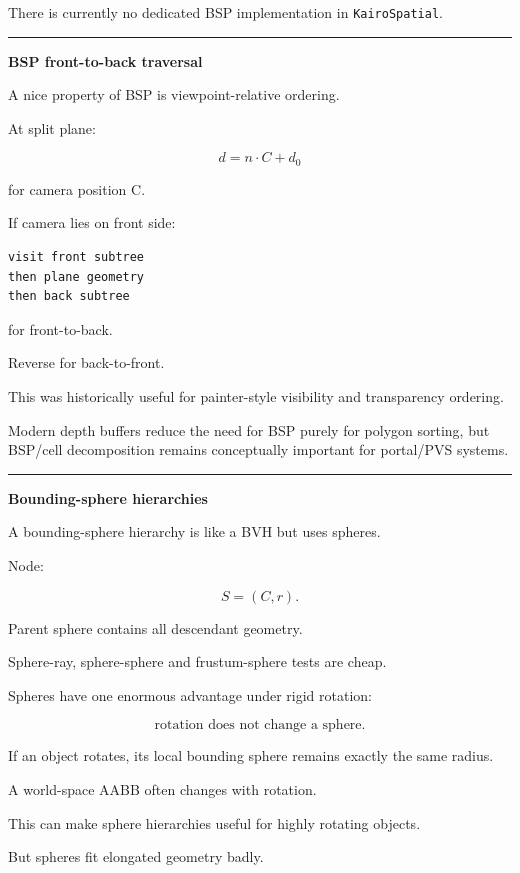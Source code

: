 There is currently no dedicated BSP implementation in \texttt{KairoSpatial}.

\begin{center}\rule{0.5\linewidth}{0.5pt}\end{center}

\textbf{BSP front-to-back traversal}

A nice property of BSP is viewpoint-relative ordering.

At split plane:

\[
d=n\cdot C+d_0
\]

for camera position C.

If camera lies on front side:

\begin{verbatim}
visit front subtree
then plane geometry
then back subtree
\end{verbatim}

for front-to-back.

Reverse for back-to-front.

This was historically useful for painter-style visibility and transparency ordering.

Modern depth buffers reduce the need for BSP purely for polygon sorting, but BSP/cell decomposition remains conceptually important for portal/PVS systems.

\begin{center}\rule{0.5\linewidth}{0.5pt}\end{center}

\textbf{Bounding-sphere hierarchies}

A bounding-sphere hierarchy is like a BVH but uses spheres.

Node:

\[
S=(C,r).
\]

Parent sphere contains all descendant geometry.

Sphere-ray, sphere-sphere and frustum-sphere tests are cheap.

Spheres have one enormous advantage under rigid rotation:

\[
\text{rotation does not change a sphere}.
\]

If an object rotates, its local bounding sphere remains exactly the same radius.

A world-space AABB often changes with rotation.

This can make sphere hierarchies useful for highly rotating objects.

But spheres fit elongated geometry badly.

